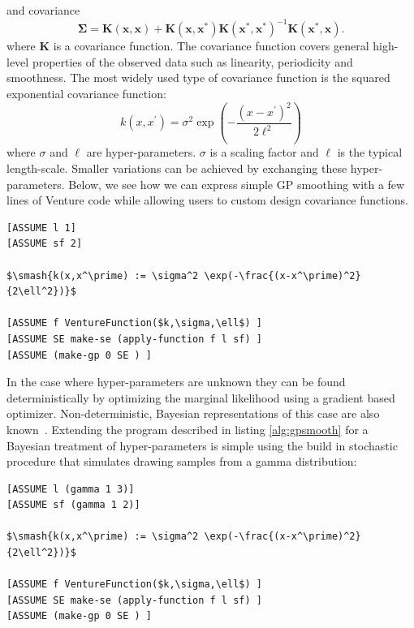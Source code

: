 \documentclass{article} %
\begin{document}
and covariance
\begin{equation}
\label{eq:conditonalGaussianCovariance}
\bm{\Sigma} =  \mathbf{K}(\mathbf{x},\mathbf{x}) + \mathbf{K}(\mathbf{x},\mathbf{x}^*)\mathbf{K}(\mathbf{x}^*,\mathbf{x}^*)^{-1} \mathbf{K}(\mathbf{x}^*,\mathbf{x}).
\end{equation}
where $\mathbf{K}$ is a covariance function. The covariance function covers general high-level properties of the observed data such as linearity, periodicity and smoothness. The most widely used type of covariance function is the squared exponential covariance function:
\begin{equation}
k(x,x^\prime) = \sigma^2 \exp(-\frac{(x-x^\prime)^2}{2\ell^2})
\end{equation}
where $\sigma$ and $\ell$ are hyper-parameters. $\sigma$ is a scaling factor and $\ell$ is the typical length-scale.
Smaller variations can be achieved by exchanging these hyper-parameters. Below, we see how we can express simple GP smoothing with a few lines of Venture code while allowing users to custom design covariance functions. 
\begin{minipage}{\linewidth}
\belowcaptionskip=-10pt
\begin{lstlisting}[frame=single,label=alg:gpsmooth,caption=GP Smoothing,mathescape]
[ASSUME l 1]
[ASSUME sf 2]

$\smash{k(x,x^\prime) := \sigma^2 \exp(-\frac{(x-x^\prime)^2}{2\ell^2})}$

[ASSUME f VentureFunction($k,\sigma,\ell$) ]
[ASSUME SE make-se (apply-function f l sf) ]
[ASSUME (make-gp 0 SE ) ]
\end{lstlisting}
\end{minipage}


In the case where hyper-parameters are unknown they can be found deterministically by optimizing the marginal likelihood using a gradient based optimizer. Non-deterministic, Bayesian representations of this case are also known~\citep{neal1997monte}. Extending the program described in listing \ref{alg:gpsmooth} for a Bayesian treatment of hyper-parameters is simple using the build in stochastic procedure that simulates drawing samples from a gamma distribution:

\begin{minipage}{\linewidth}
\begin{lstlisting}[frame=single,label=alg:gpNeal,caption=Bayesian GP Smoothing,mathescape]
[ASSUME l (gamma 1 3)]
[ASSUME sf (gamma 1 2)]

$\smash{k(x,x^\prime) := \sigma^2 \exp(-\frac{(x-x^\prime)^2}{2\ell^2})}$

[ASSUME f VentureFunction($k,\sigma,\ell$) ]
[ASSUME SE make-se (apply-function f l sf) ]
[ASSUME (make-gp 0 SE ) ]
\end{lstlisting}
\end{minipage}
\end{document}
